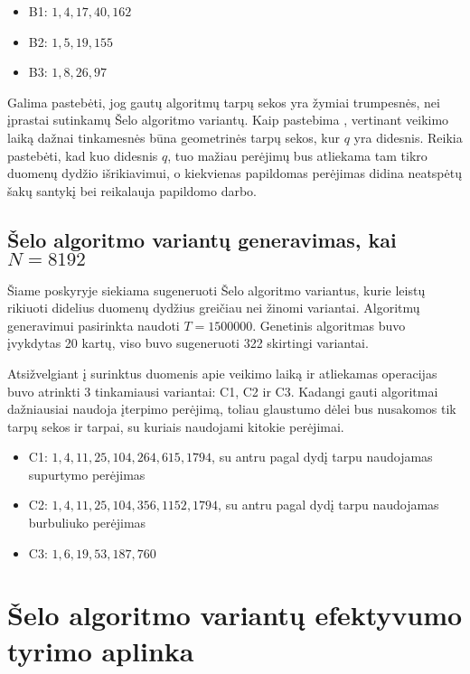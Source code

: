 \documentclass{VUMIFInfBakalaurinis}
\begin{document}
\begin{itemize}
  \item B1: $1, 4, 17, 40, 162$
  \item B2: $1, 5, 19, 155$
  \item B3: $1, 8, 26, 97 $
\end{itemize}

Galima pastebėti, jog gautų algoritmų tarpų sekos yra žymiai trumpesnės, nei įprastai sutinkamų Šelo algoritmo variantų.
Kaip pastebima \cite{Radavičius_Baranauskas_2013}, vertinant veikimo laiką dažnai tinkamesnės būna geometrinės tarpų sekos, kur $q$ yra didesnis.
Reikia pastebėti, kad kuo didesnis $q$, tuo mažiau perėjimų bus atliekama tam tikro duomenų dydžio išrikiavimui,
o kiekvienas papildomas perėjimas didina neatspėtų šakų santykį bei reikalauja papildomo darbo.  

\subsection{Šelo algoritmo variantų generavimas, kai $N = 8192$}

Šiame poskyryje siekiama sugeneruoti Šelo algoritmo variantus,
kurie leistų rikiuoti didelius duomenų dydžius greičiau nei žinomi variantai.
Algoritmų generavimui pasirinkta naudoti $T = 1500000$.
Genetinis algoritmas buvo įvykdytas 20 kartų, viso buvo sugeneruoti 322 skirtingi variantai.

Atsižvelgiant į surinktus duomenis apie veikimo laiką ir atliekamas operacijas buvo atrinkti 3 tinkamiausi variantai: C1, C2 ir C3.
Kadangi gauti algoritmai dažniausiai naudoja įterpimo perėjimą, toliau glaustumo dėlei bus nusakomos tik tarpų sekos ir tarpai, su kuriais naudojami kitokie perėjimai.

\begin{itemize}
  \item C1: $1, 4, 11, 25, 104, 264, 615, 1794$, su antru pagal dydį tarpu naudojamas supurtymo perėjimas
  \item C2: $1, 4, 11, 25, 104, 356, 1152, 1794$, su antru pagal dydį tarpu naudojamas burbuliuko perėjimas
  \item C3: $1, 6, 19, 53, 187, 760 $
\end{itemize}

\section{Šelo algoritmo variantų efektyvumo tyrimo aplinka}
\end{document}
